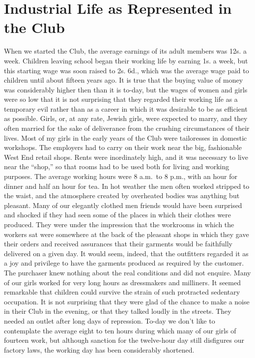 \chapter[Industrial Life as Represented in the Club][Industry in the Club]{Industrial Life as Represented in the Club}

When we started the Club, the average earnings of its
adult members was 12s. a week. Children leaving school
began their working life by earning 1s. a week, but
this starting wage was soon raised to 2s. 6d., which was
the average wage paid to children until about fifteen
years ago. It is true that the buying value of money was
considerably higher then than it is to-day, but the wages
of women and girls were so low that it is not surprising
that they regarded their working life as a temporary evil
rather than as a career in which it was desirable to be as
efficient as possible. Girls, or, at any rate, Jewish girls,
were expected to marry, and they often married for the
sake of deliverance from the crushing circumstances of
their lives. Most of my girls in the early years of the Club
were tailoresses in domestic workshops. The employers
had to carry on their work near the big, fashionable West
End retail shops. Rents were inordinately high, and it
was necessary to live near the “shop,” so that rooms had
to be used both for living and working purposes. The
average working hours were 8 a.m.\ to 8 p.m., with an
hour for dinner and half an hour for tea. In hot weather
the men often worked stripped to the waist, and the
atmosphere created by overheated bodies was anything
but pleasant. Many of our elegantly clothed men friends
would have been surprised and shocked if they had seen
some of the places in which their clothes were produced.
They were under the impression that the workrooms in
which the workers sat were somewhere at the back of the
pleasant shops in which they gave their orders and
received assurances that their garments would be faithfully
delivered on a given day. It would seem, indeed, that the
outfitters regarded it as a joy and privilege to have the
garments produced as required by the customer. The
purchaser knew nothing about the real conditions and
did not enquire. Many of our girls worked for very long
hours as dressmakers and milliners. It seemed remarkable
that children could survive the strain of such
protracted sedentary occupation. It is not surprising that
they were glad of the chance to make a noise in their
Club in the evening, or that they talked loudly in the
streets. They needed an outlet after long days of repression.
To-day we don’t like to contemplate the average
eight to ten hours during which many of our girls of
fourteen work, but although sanction for the twelve-hour
day still disfigures our factory laws, the working day has
been considerably shortened.

